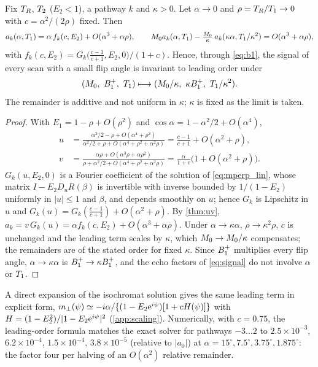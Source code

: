 \begin{proposition}\label{prop:scaling}
Fix $T_R$, $T_2$ ($E_2<1$), a pathway $k$ and $\kappa>0$. Let $\alpha\to0$ and $\rho=T_R/T_1\to0$
with $c=\alpha^2/(2\rho)$ fixed. Then
\begin{equation}
  a_k(\alpha,T_1)=\alpha\,f_k(c,E_2)+O(\alpha^3+\alpha\rho),\qquad
  M_0 a_k(\alpha,T_1)-\tfrac{M_0}{\kappa}\,a_k(\kappa\alpha,T_1/\kappa^2)=O(\alpha^3+\alpha\rho),
  \label{eq:scaling}
\end{equation}
with $f_k(c,E_2)=G_k\bigl(\tfrac{c-1}{c+1},E_2,0\bigr)/(1+c)$. Hence, through \eqref{eq:b1}, the
signal of every scan with a small flip angle is invariant to leading order under
\begin{equation}
  (\Mzero,\ \Bone,\ \Tone)\longmapsto(\Mzero/\kappa,\ \kappa\Bone,\ \Tone/\kappa^2).
  \label{eq:sym}
\end{equation}
The remainder is additive and not uniform in $\kappa$; $\kappa$ is fixed as the limit is taken.
\end{proposition}
\begin{proof}
With $E_1=1-\rho+O(\rho^2)$ and $\cos\alpha=1-\alpha^2/2+O(\alpha^4)$,
\begin{align*}
  u&=\frac{\alpha^2/2-\rho+O(\alpha^4+\rho^2)}{\alpha^2/2+\rho+O(\alpha^4+\rho^2+\alpha^2\rho)}
   =\frac{c-1}{c+1}+O(\alpha^2+\rho),\\
  v&=\frac{\alpha\rho+O(\alpha^3\rho+\alpha\rho^2)}{\rho+\alpha^2/2+O(\alpha^4+\rho^2+\alpha^2\rho)}
   =\frac{\alpha}{1+c}\bigl(1+O(\alpha^2+\rho)\bigr).
\end{align*}
$G_k(u,E_2,0)$ is a Fourier coefficient of the solution of \eqref{eq:mperp_lin}, whose matrix
$I-E_2D_uR(\beta)$ is invertible with inverse bounded by $1/(1-E_2)$ uniformly in $|u|\le1$ and
$\beta$, and depends smoothly on $u$; hence $G_k$ is Lipschitz in $u$ and
$G_k(u)=G_k(\tfrac{c-1}{c+1})+O(\alpha^2+\rho)$. By \cref{thm:uv},
$a_k=v\,G_k(u)=\alpha f_k(c,E_2)+O(\alpha^3+\alpha\rho)$. Under $\alpha\to\kappa\alpha$,
$\rho\to\kappa^2\rho$, $c$ is unchanged and the leading term scales by $\kappa$, which
$M_0\to M_0/\kappa$ compensates; the remainders are of the stated order for fixed $\kappa$.
Since $B_1^{+}$ multiplies every flip angle, $\alpha\to\kappa\alpha$ is $B_1^{+}\to\kappa B_1^{+}$, and the echo
factors of \eqref{eq:signal} do not involve $\alpha$ or $T_1$.
\end{proof}

A direct expansion of the isochromat solution gives the same leading term in explicit form,
$m_\perp(\psi)\simeq-i\alpha/\{(1-E_2\mathrm{e}^{i\psi})[1+cH(\psi)]\}$ with
$H=(1-E_2^2)/|1-E_2\mathrm{e}^{i\psi}|^2$ (\cref{app:scaling}). Numerically, with $c=0.75$, the
leading-order formula matches the exact solver for pathways $-3\ldots2$ to $2.5\times10^{-3}$,
$6.2\times10^{-4}$, $1.5\times10^{-4}$, $3.8\times10^{-5}$ (relative to $|a_0|$) at
$\alpha=15^\circ,7.5^\circ,3.75^\circ,1.875^\circ$: the factor four per halving of an $O(\alpha^2)$
relative remainder.

